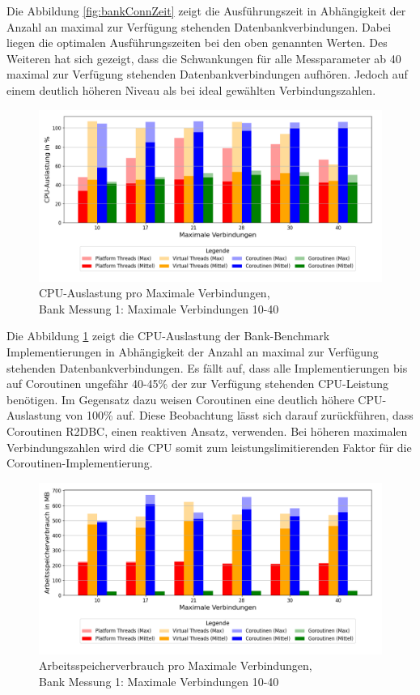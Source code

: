 \documentclass[fontsize=12pt,paper=a4,twoside=semi,parskip=half-,headsepline,headinclude]{scrreprt}
\begin{document}
Die Abbildung \ref{fig:bankConnZeit} zeigt die Ausführungszeit in Abhängigkeit der Anzahl an maximal zur Verfügung stehenden Datenbankverbindungen. Dabei liegen die optimalen Ausführungszeiten bei den oben genannten Werten. Des Weiteren hat sich gezeigt, dass die Schwankungen für alle Messparameter ab 40 maximal zur Verfügung stehenden Datenbankverbindungen aufhören. Jedoch auf einem deutlich höheren Niveau als bei ideal gewählten Verbindungszahlen.

\begin{figure}[H]
	\centering
	\includegraphics[scale=0.5]{figures/bank/connections10-40/cpu_usage_bar_plot.png}
	\caption{CPU-Auslastung pro Maximale Verbindungen,\\ Bank Messung 1: Maximale Verbindungen 10-40}
	\label{fig:bankConnCPU}
\end{figure}

Die Abbildung \ref{fig:bankConnCPU} zeigt die CPU-Auslastung der Bank-Benchmark Implementierungen in Abhängigkeit der Anzahl an maximal zur Verfügung stehenden Datenbankverbindungen. Es fällt auf, dass alle Implementierungen bis auf Coroutinen ungefähr 40-45\% der zur Verfügung stehenden CPU-Leistung benötigen. Im Gegensatz dazu weisen Coroutinen eine deutlich höhere CPU-Auslastung von 100\% auf. Diese Beobachtung lässt sich darauf zurückführen, dass Coroutinen R2DBC, einen reaktiven Ansatz, verwenden. Bei höheren maximalen Verbindungszahlen wird die CPU somit zum leistungslimitierenden Faktor für die Coroutinen-Implementierung.

\begin{figure}[H]
	\centering
	\includegraphics[scale=0.5]{figures/bank/connections10-40/memory_usage_bar_plot.png}
	\caption{Arbeitsspeicherverbrauch pro Maximale Verbindungen,\\ Bank Messung 1: Maximale Verbindungen 10-40}
	\label{fig:bankConnRAM}
\end{figure}
\end{document}
